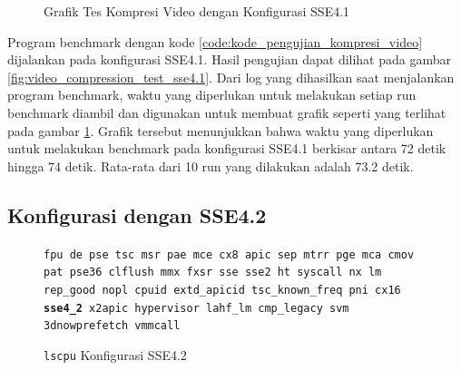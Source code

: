 \begin{figure}
    \centering
    \caption{Grafik Tes Kompresi Video dengan Konfigurasi SSE4.1}
    \label{fig:video_compression_test_sse4.1_graph}
\end{figure}

Program benchmark dengan kode \ref{code:kode_pengujian_kompresi_video} dijalankan pada konfigurasi SSE4.1. Hasil pengujian dapat dilihat pada gambar \ref{fig:video_compression_test_sse4.1}. Dari log yang dihasilkan saat menjalankan program benchmark, waktu yang diperlukan untuk melakukan setiap run benchmark diambil dan digunakan untuk membuat grafik seperti yang terlihat pada gambar \ref{fig:video_compression_test_sse4.1_graph}. Grafik tersebut menunjukkan bahwa waktu yang diperlukan untuk melakukan benchmark pada konfigurasi SSE4.1 berkisar antara 72 detik hingga 74 detik. Rata-rata dari 10 run yang dilakukan adalah 73.2 detik.

\subsection{Konfigurasi dengan SSE4.2}
\begin{figure}
    \texttt{fpu de pse tsc msr pae mce cx8 apic sep mtrr pge mca cmov pat pse36 clflush mmx fxsr sse sse2 ht syscall nx lm rep\_good nopl cpuid extd\_apicid tsc\_known\_freq pni cx16 \textbf{sse4\_2} x2apic hypervisor lahf\_lm cmp\_legacy svm 3dnowprefetch vmmcall}
    \caption{\texttt{lscpu} Konfigurasi SSE4.2}
    \label{fig:lscpu_video_compression_test_sse4.2}
\end{figure}


